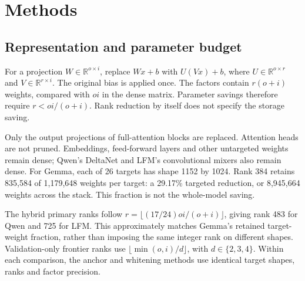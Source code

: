 \documentclass[conference]{IEEEtran}
\begin{document}
\section{Methods}
\subsection{Representation and parameter budget}
For a projection $W\in\mathbb{R}^{o\times i}$, replace $Wx+b$ with $U(Vx)+b$, where $U\in\mathbb{R}^{o\times r}$ and $V\in\mathbb{R}^{r\times i}$. The original bias is applied once. The factors contain $r(o+i)$ weights, compared with $oi$ in the dense matrix. Parameter savings therefore require $r<oi/(o+i)$. Rank reduction by itself does not specify the storage saving.\par\smallskip
Only the output projections of full-attention blocks are replaced. Attention heads are not pruned. Embeddings, feed-forward layers and other untargeted weights remain dense; Qwen's DeltaNet and LFM's convolutional mixers also remain dense. For Gemma, each of 26 targets has shape 1152 by 1024. Rank 384 retains 835,584 of 1,179,648 weights per target: a 29.17\% targeted reduction, or 8,945,664 weights across the stack. This fraction is not the whole-model saving.\par\smallskip
The hybrid primary ranks follow $r=\lfloor(17/24)oi/(o+i)\rfloor$, giving rank 483 for Qwen and 725 for LFM. This approximately matches Gemma's retained target-weight fraction, rather than imposing the same integer rank on different shapes. Validation-only frontier ranks use $\lfloor\min(o,i)/d\rfloor$, with $d\in\{2,3,4\}$. Within each comparison, the anchor and whitening methods use identical target shapes, ranks and factor precision.\par\smallskip
\end{document}
